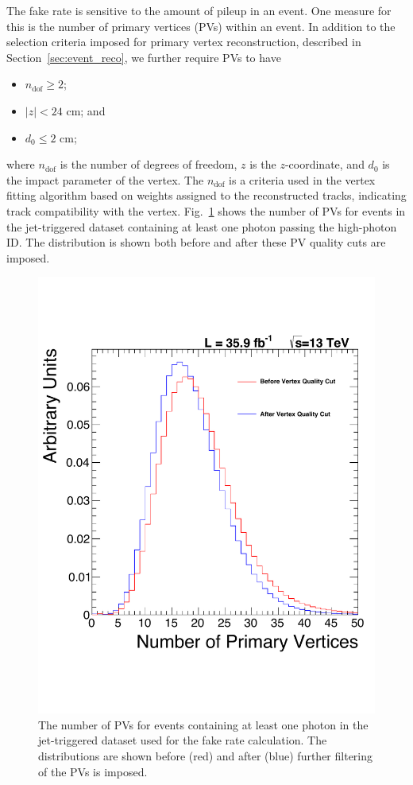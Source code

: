 The fake rate is sensitive to the amount of pileup in an event. One measure for this is the number of primary vertices (PVs) within an event. In addition to the selection criteria imposed for primary vertex reconstruction, described in Section~\ref{sec:event_reco}, we further require PVs to have
\begin{itemize}
  \item $n_{\text{dof}} \ge 2$;
  \item $|z| < 24$ cm; and
  \item $d_0 \le 2$ cm;
\end{itemize}
\noindent where $n_{\text{dof}}$ is the number of degrees of freedom, $z$ is the $z$-coordinate, and $d_0$ is the impact parameter of the vertex. The $n_{\text{dof}}$ is a criteria used in the vertex fitting algorithm based on weights assigned to the reconstructed tracks, indicating track compatibility with the vertex. Fig.~\ref{fig:nvertices} shows the number of PVs for events in the jet-triggered dataset containing at least one photon passing the high-\pt photon ID. The distribution is shown both before and after these PV quality cuts are imposed.

\begin{figure}[!htbp]
  \centering
  \includegraphics[scale=0.38]{figures/vtxComp2016.pdf}
  \caption{The number of PVs for events containing at least one photon in the jet-triggered dataset used for the fake rate calculation. The distributions are shown before (red) and after (blue) further filtering of the PVs is imposed.}
  \label{fig:nvertices}
\end{figure}

